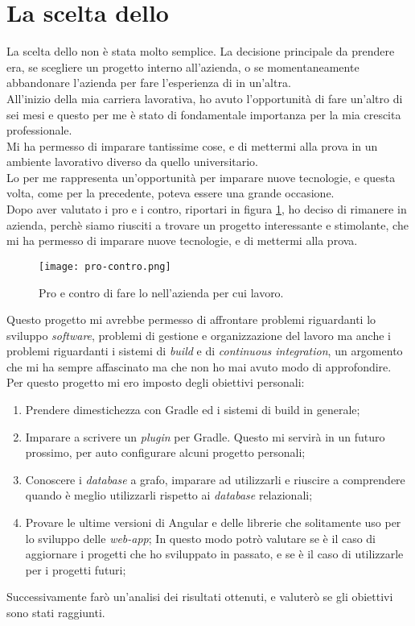 \section{La scelta dello \stage}
La scelta dello \stage{} non è stata molto semplice. La decisione principale da prendere era, se scegliere un progetto interno all'azienda, o 
se momentaneamente abbandonare l'azienda per fare l'esperienza di \stage{} in un'altra.\\ 
All'inizio della mia carriera lavorativa, ho avuto l'opportunità di fare un'altro \stage{} di sei mesi e questo per me è stato di fondamentale
importanza per la mia crescita professionale.\\ Mi ha permesso di imparare tantissime cose, e di mettermi alla prova in un ambiente lavorativo
diverso da quello universitario.\\ 
Lo \stage{} per me rappresenta un'opportunità per imparare nuove tecnologie, e questa volta, come per la precedente, 
poteva essere una grande occasione. \\
Dopo aver valutato i pro e i contro, riportari in figura \ref*{fig:pro-contro}, ho deciso di rimanere in azienda, perchè siamo riusciti
a trovare un progetto interessante e stimolante, che mi ha permesso di imparare nuove tecnologie, e di mettermi alla prova.\\
\begin{figure}[!h] 
  \centering 
  \texttt{[image: pro-contro.png]}
  \caption{Pro e contro di fare lo \stage{} nell'azienda per cui lavoro.}
  \label{fig:pro-contro}
\end{figure}

Questo progetto mi avrebbe permesso di affrontare problemi riguardanti lo sviluppo \textit{software}, problemi di gestione e organizzazione del lavoro ma 
anche i problemi riguardanti i sistemi di \textit{build} e di \textit{continuous integration}, un argomento che mi ha sempre affascinato ma che non ho mai
avuto modo di approfondire.\\
Per questo progetto mi ero imposto degli obiettivi personali:
\begin{enumerate}
  \item Prendere dimestichezza con Gradle ed i sistemi di build in generale;
  \item Imparare a scrivere un \textit{plugin} per Gradle. Questo mi servirà in un futuro prossimo, per auto configurare alcuni progetto personali;
  \item Conoscere i \textit{database} a grafo, imparare ad utilizzarli e riuscire a comprendere quando è meglio utilizzarli rispetto ai \textit{database} relazionali;
  \item Provare le ultime versioni di Angular e delle librerie che solitamente uso per lo sviluppo delle \textit{web-app}; 
      In questo modo potrò valutare se è il caso di aggiornare i progetti che ho sviluppato in passato, e se è il caso di utilizzarle per i progetti futuri;
\end{enumerate}
Successivamente farò un'analisi dei risultati ottenuti, e valuterò se gli obiettivi sono stati raggiunti.\\
